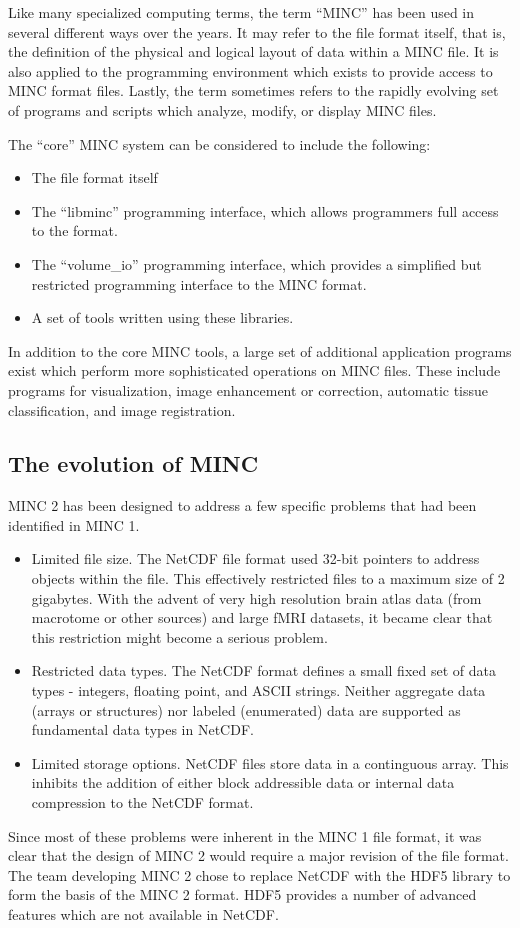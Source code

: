 \documentclass{article}
\begin{document}
Like many specialized computing terms, the term ``MINC'' has been used in
several different ways over the years.  It may refer to the file
format itself, that is, the definition of the physical and logical
layout of data within a MINC file. It is also applied to the
programming environment which exists to provide access to MINC format
files.  Lastly, the term sometimes refers to the rapidly evolving set
of programs and scripts which analyze, modify, or display MINC files.

The ``core'' MINC system can be considered to include the following:
\begin{itemize}
\item The file format itself
\item The ``libminc'' programming interface, which allows programmers
full access to the format.
\item The ``volume\_io'' programming interface, which provides a 
simplified but restricted programming interface to the MINC format.
\item A set of tools written using these libraries.
\end{itemize}

In addition to the core MINC tools, a large set of additional
application programs exist which perform more sophisticated operations
on MINC files.  These include programs for visualization, image
enhancement or correction, automatic tissue classification, and image
registration.

\subsection{The evolution of MINC}
MINC 2 has been designed to address a few specific problems that
had been identified in MINC 1. 
\begin{itemize}
\item Limited file size.  The NetCDF file format used 32-bit pointers to
address objects within the file.  This effectively restricted files to a 
maximum size of 2 gigabytes.  With the advent of very high resolution
brain atlas data (from macrotome or other sources) and large fMRI datasets,
it became clear that this restriction might become a serious problem.
\item Restricted data types.  The NetCDF format defines a small fixed
set of data types - integers, floating point, and ASCII strings.  
Neither aggregate data (arrays or structures) nor labeled (enumerated) data
are supported as fundamental data types in NetCDF.
\item Limited storage options.  NetCDF files store data in a
continguous array.  This inhibits the addition of either block
addressible data or internal data compression to the NetCDF format.
\end{itemize}
Since most of these problems were inherent in the MINC 1 file format,
it was clear that the design of MINC 2 would require a major revision
of the file format.  The team developing MINC 2 chose to replace
NetCDF with the HDF5 library to form the basis of the MINC 2 format.
HDF5 provides a number of advanced features which are not available in
NetCDF.
\end{document}
